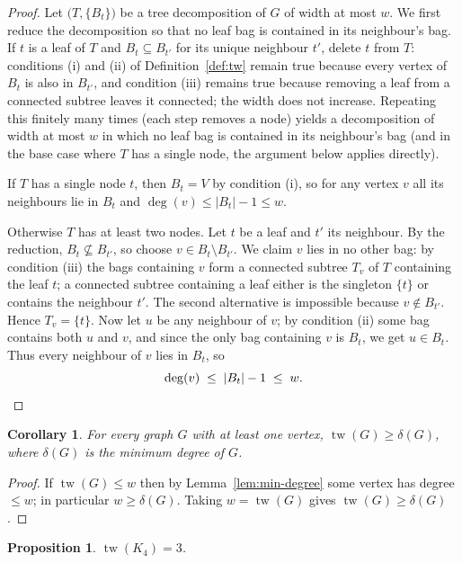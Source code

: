 \documentclass[11pt]{article}
\newtheorem{corollary}[theorem]{Corollary}
\newtheorem{proposition}[theorem]{Proposition}
\theoremstyle{definition}
\theoremstyle{remark}
\newcommand{\tw}{\operatorname{tw}}
\begin{document}
\begin{proof}
Let $\bigl(T, \{B_t\}\bigr)$ be a tree decomposition of $G$ of width at most
$w$. We first reduce the decomposition so that no leaf bag is contained in its
neighbour's bag. If $t$ is a leaf of $T$ and $B_t \subseteq B_{t'}$ for its
unique neighbour $t'$, delete $t$ from $T$: conditions (i) and (ii) of
Definition~\ref{def:tw} remain true because every vertex of $B_t$ is also in
$B_{t'}$, and condition (iii) remains true because removing a leaf from a
connected subtree leaves it connected; the width does not increase. Repeating
this finitely many times (each step removes a node) yields a decomposition of
width at most $w$ in which no leaf bag is contained in its neighbour's bag
(and in the base case where $T$ has a single node, the argument below applies
directly).

If $T$ has a single node $t$, then $B_t = V$ by condition (i), so for any
vertex $v$ all its neighbours lie in $B_t$ and $\deg(v) \le |B_t| - 1 \le w$.

Otherwise $T$ has at least two nodes. Let $t$ be a leaf and $t'$ its
neighbour. By the reduction, $B_t \not\subseteq B_{t'}$, so choose $v \in B_t
\setminus B_{t'}$. We claim $v$ lies in no other bag: by condition (iii) the
bags containing $v$ form a connected subtree $T_v$ of $T$ containing the leaf
$t$; a connected subtree containing a leaf either is the singleton $\{t\}$ or
contains the neighbour $t'$. The second alternative is impossible because
$v \notin B_{t'}$. Hence $T_v = \{t\}$. Now let $u$ be any neighbour of $v$;
by condition (ii) some bag contains both $u$ and $v$, and since the only bag
containing $v$ is $B_t$, we get $u \in B_t$. Thus every neighbour of $v$ lies
in $B_t$, so
\[
\deg(v) \;\le\; |B_t| - 1 \;\le\; w . \qedhere
\]
\end{proof}

\begin{corollary}\label{cor:delta}
For every graph $G$ with at least one vertex, $\tw(G) \ge \delta(G)$, where
$\delta(G)$ is the minimum degree of $G$.
\end{corollary}

\begin{proof}
If $\tw(G) \le w$ then by Lemma~\ref{lem:min-degree} some vertex has degree
$\le w$; in particular $w \ge \delta(G)$. Taking $w = \tw(G)$ gives
$\tw(G) \ge \delta(G)$.
\end{proof}

\begin{proposition}\label{prop:tw-k4}
$\tw(K_4) = 3$.
\end{proposition}
\end{document}
